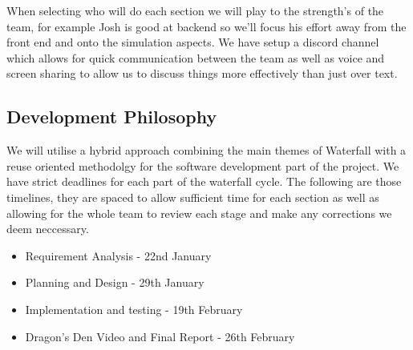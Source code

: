 \documentclass{article}
\begin{document}
When selecting who will do each section we will play to the strength's of the 
team, for example Josh is good at backend so we'll focus his effort away from 
the front end and onto the simulation aspects. We have setup a discord channel which 
allows for quick communication between the team as well as voice and screen sharing 
to allow us to discuss things more effectively than just over text.

\subsection{Development Philosophy}
We will utilise a hybrid approach combining the main themes of Waterfall with a 
reuse oriented methodolgy for the software development part of the project. We 
have strict deadlines for each part of the waterfall cycle. The following are 
those timelines, they are spaced to allow sufficient time for each section as 
well as allowing for the whole team to review each stage and make any corrections 
we deem neccessary. 

\begin{itemize}
  \item Requirement Analysis
        - 22nd January
  \item Planning and Design
        - 29th January
  \item Implementation and testing
        - 19th February
  \item Dragon's Den Video and Final Report
        - 26th February
\end{itemize}
\end{document}
